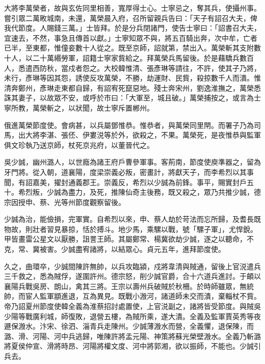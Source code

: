 \begin{pinyinscope}
 大將李萬榮者，故與玄佐同里相善，寬厚得士心。士寧忌之，奪其兵，使攝州事。嘗引眾二萬畋城南，未還，萬榮晨入府，召所留親兵告曰：「天子有詔召大夫，俾我代節度。人賜錢三萬。」士皆拜。於是分兵閉諸門，使告士寧曰：「詔書召大夫，宜速去，不然，事急且傳首以獻。」士寧知眾不與，將五百騎出奔，次中牟，亡者已半，至東都，惟僮妾數十人從之。既至京師，詔就第，禁出入。萬榮斬其支附數十人，以二十萬緡勞軍，詔籍士寧家貲給之。拜萬榮兵馬留後。於是藉驕兵數百人，悉遣西防秋，當戍者怨之。大校韓惟清、張彥琳等請往，不許，使其子乃將，未行，彥琳等因其怨，誘使反攻萬榮，不勝，劫運財、民貲，殺掠數千人而潰。惟清奔鄭州，彥琳走東都自歸，有詔宥死竄惡地。殘士奔宋州，劉逸淮撫之，萬榮悉誅其妻子，以故眾不安，或呼於市曰：「大軍至，城且破。」萬榮捕按之，或言為士寧所教，萬榮斬之，以狀聞，故士寧斥置郴州。



 俄進萬榮節度使。會病甚，以兵屬鄧惟恭。惟恭者，與萬榮同里閈。而署子乃為司馬，出大將李湛、張伾、伊婁涚等於外，欲殺之，不果。萬榮死，是夜惟恭與監軍俱文珍執乃送京師，杖死京兆府，以董晉代之。



 吳少誠，幽州潞人，以世廕為諸王府戶曹參軍事。客荊南，節度使庾準器之，留為牙門將。從入朝，道襄陽，度梁崇義必叛，密畫計，將獻天子，而李希烈以其事聞，有詔嘉美，擢封通義郡王。崇義反，希烈以少誠為前鋒。事平，賜實封戶五十。希烈叛，少誠為盡力，及死，推陳仙奇主後務，既又殺之，眾乃共推少誠，德宗因授申、蔡、光等州節度觀察留後。



 少誠為治，能儉損，完軍實。自希烈以來，申、蔡人劫於苛法而忘所歸，及耆長既物故，則壯者習見暴掠，恬於搏斗。地少馬，乘騾以戰，號「騾子軍」，尤悍銳。甲皆畫雷公星文以厭勝，詛詈王師。其屬鄭常、楊冀欲劫少誠，逐之以聽命，不克，常、冀被害。少誠盡宥諸將，以結眾心。貞元五年，進拜節度使。



 久之，曲環卒，少誠間陳許無帥，以兵攻臨潁，戍將韋清與賊通，留後上官涚遣兵三千救之，悉為賊俘，遂圍許州。德宗怒，削少誠官爵，合十六道兵進討。于頔以襄陽兵戰吳房、朗山，禽其三將。王宗以壽州兵破賊於秋柵。於時師雖眾，無統帥，而宦人監軍顓進退，互為異見。既戰小溵河，諸道師未交而潰，棄輜杖不貲。帝乃詔夏州節度使韓全義為淮蔡招討處置使，上官涚副之，諸將皆受節度。與賊吳少陽等戰廣利城，師復敗，退營五樓，為賊所乘，遂大潰。全義及監軍賈英秀等夜遯保溵水。汴宋、徐泗、淄青兵走陳州。少誠薄溵水而營，全義懼，退保陳，而潞、滑、河陽、河中兵逃歸，唯陳許將孟元陽、神策將蘇光榮壁溵水。全義乃斬潞將夏侯仲宣、滑將時昂、河陽將權文度、河中將郭湘，欲以振師，不能也。少誠引兵去。




\end{pinyinscope}
